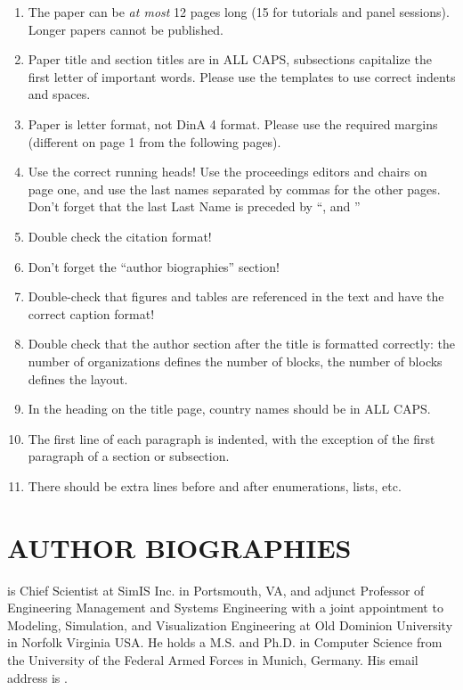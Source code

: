 \documentclass{wscpaperproc}
\theoremstyle{wsc}
\begin{document}
\begin{enumerate}
\item   The paper can be \textit{at most} 12 pages long (15 for tutorials and panel sessions). Longer papers cannot be published.
\item	Paper title and section titles are in ALL CAPS, subsections capitalize the first letter of important words. Please use the templates to use correct indents and spaces.
\item	Paper is letter format, not DinA 4 format. Please use the required margins (different on page 1 from the following pages).
\item	Use the correct running heads! Use the proceedings editors and chairs on page one, and use the last names separated by commas for the other pages. Don't forget that the last Last Name is preceded by ``, and ''
\item	Double check the citation format!
\item	Don't forget the ``author biographies'' section!
\item	Double-check that figures and tables are referenced in the text and have the correct caption format!
\item	Double check that the author section after the title is formatted correctly: the number of organizations defines the number of blocks, the number of blocks defines the layout.
\item	In the heading on the title page, country names should be in ALL CAPS.
\item	The first line of each paragraph is indented, with the exception of the first paragraph of a section or subsection.
\item	There should be extra lines before and after enumerations, lists, etc.
\end{enumerate}




\section*{AUTHOR BIOGRAPHIES}

 is Chief Scientist at SimIS Inc. in Portsmouth, VA, and adjunct Professor of Engineering Management and Systems Engineering with a joint appointment to Modeling, Simulation, and Visualization Engineering at Old Dominion University in Norfolk Virginia USA. He holds a M.S. and Ph.D. in Computer Science from the University of the Federal Armed Forces in Munich, Germany. His email address is .\\
\end{document}
